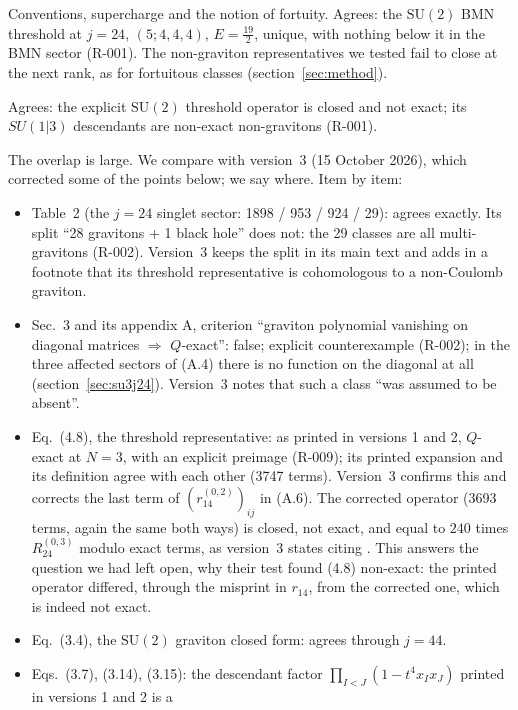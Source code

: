 \documentclass[11pt]{article}
\newcommand{\R}[1]{\textsf{R-0#1}}
\newcommand{\SU}{\mathrm{SU}}
\begin{document}
\begin{description}[style=nextline,leftmargin=1.2em]
\item[Chang, Lin \cite{CLWords}; \cite{CLCovering}.] Conventions, supercharge and the notion of fortuity. Agrees: the
$\SU(2)$ BMN threshold at $j=24$, $(5;4,4,4)$, $E=\tfrac{19}{2}$, unique, with nothing below it in the BMN sector
(\R{01}). The non-graviton representatives we tested fail to close at the next rank, as for fortuitous classes
(section~\ref{sec:method}).
\item[Choi, Kim, Lee, Park \cite{CKLP}.] Agrees: the explicit $\SU(2)$ threshold operator is closed and not exact; its
$SU(1|3)$ descendants are non-exact non-gravitons (\R{01}).
\item[Choi, Choi, Kim, Lee, Lee \cite{CCKLL}.] The overlap is large. We compare with version~3 (15 October 2026),
which corrected some of the points below; we say where. Item by item:
\begin{itemize}
\item Table~2 (the $j=24$ singlet sector: 1898 / 953 / 924 / 29): agrees exactly. Its split ``28 gravitons + 1 black
hole'' does not: the 29 classes are all multi-gravitons (\R{02}). Version~3 keeps the split in its main text and adds
in a footnote that its threshold representative is cohomologous to a non-Coulomb graviton.
\item Sec.~3 and its appendix A, criterion ``graviton polynomial vanishing on diagonal matrices $\Rightarrow$
$Q$-exact'': false; explicit counterexample (\R{02}); in the three affected sectors of (A.4) there is no function on the
diagonal at all (section~\ref{sec:su3j24}). Version~3 notes that such a class ``was assumed to be absent''.
\item Eq.~(4.8), the threshold representative: as printed in versions 1 and 2, $Q$-exact at $N=3$, with an explicit
preimage (\R{09}); its printed expansion and its definition agree with each other (3747 terms). Version~3 confirms
this and corrects the last term of $(r_{14}^{(0,2)})_{ij}$ in (A.6). The corrected operator (3693 terms, again the same
both ways) is closed, not exact, and equal to $240$ times $R_{24}^{(0,3)}$ modulo exact terms, as version~3
states citing \cite{KLLS}. This answers the question we had left open, why their test found (4.8) non-exact: the
printed operator differed, through the misprint in $r_{14}$, from the corrected one, which is indeed not exact.
\item Eq.~(3.4), the $\SU(2)$ graviton closed form: agrees through $j=44$.
\item Eqs.~(3.7), (3.14), (3.15): the descendant factor $\prod_{I<J}(1-t^4x_Ix_J)$ printed in versions 1 and 2 is a

\end{itemize}
\end{description}
\end{document}
